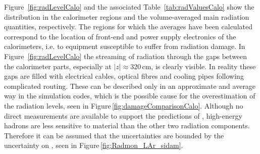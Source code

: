 \documentclass[cernpreprint, atlasdraft=false, UKenglish,british,orcidlogo, texmf, orcidlogo]{atlasdoc}
\begin{document}
Figure~\ref{fig:radLevelCalo} and the associated Table~\ref{tab:radValuesCalo} show the \phieqv distribution in the
calorimeter regions and the volume-averaged main radiation quantities, respectively. The regions for which the averages
have been calculated correspond to the location of front-end and power supply electronics of the calorimeters, i.e. to
equipment susceptible to suffer from radiation damage.
In Figure~\ref{fig:radLevelCalo} the streaming of radiation through the gaps between the calorimeter parts, especially at
$|z|\approx 320$\,cm, is clearly visible.
In reality these gaps are filled with electrical cables, optical fibres and cooling pipes following complicated routing.
These can be described only in an approximate and average way in the simulation codes, which is the possible cause for the
overestimation of the radiation levels, seen in Figure\,\ref{fig:damageComparisonCalo}.
Although no direct measurements are available to support the predictions of \phiSEU, high-energy hadrons are less sensitive
to material than the other two radiation components. Therefore it can be assumed that the uncertainties are bounded by the
uncertainty on \phieqv, seen in Figure\,\ref{fig:Radmon_LAr_sidam}.
 
\end{document}
